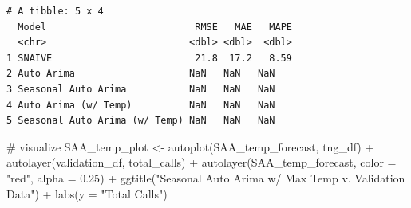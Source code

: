 \documentclass[
  letterpaper,
  DIV=11,
  numbers=noendperiod]{scrartcl}
\newenvironment{Shaded}{\begin{snugshade}}{\end{snugshade}}
\newcommand{\AttributeTok}[1]{\textcolor[rgb]{0.40,0.45,0.13}{#1}}
\newcommand{\CommentTok}[1]{\textcolor[rgb]{0.37,0.37,0.37}{#1}}
\newcommand{\FloatTok}[1]{\textcolor[rgb]{0.68,0.00,0.00}{#1}}
\newcommand{\FunctionTok}[1]{\textcolor[rgb]{0.28,0.35,0.67}{#1}}
\newcommand{\NormalTok}[1]{\textcolor[rgb]{0.00,0.23,0.31}{#1}}
\newcommand{\OtherTok}[1]{\textcolor[rgb]{0.00,0.23,0.31}{#1}}
\newcommand{\SpecialCharTok}[1]{\textcolor[rgb]{0.37,0.37,0.37}{#1}}
\newcommand{\StringTok}[1]{\textcolor[rgb]{0.13,0.47,0.30}{#1}}
\begin{document}
\begin{Shaded}
\end{Shaded}

\begin{verbatim}
# A tibble: 5 x 4
  Model                          RMSE   MAE   MAPE
  <chr>                         <dbl> <dbl>  <dbl>
1 SNAIVE                         21.8  17.2   8.59
2 Auto Arima                    NaN   NaN   NaN   
3 Seasonal Auto Arima           NaN   NaN   NaN   
4 Auto Arima (w/ Temp)          NaN   NaN   NaN   
5 Seasonal Auto Arima (w/ Temp) NaN   NaN   NaN   
\end{verbatim}

\begin{Shaded}
\begin{Highlighting}[]
\CommentTok{\# visualize}
\NormalTok{SAA\_temp\_plot }\OtherTok{\textless{}{-}} \FunctionTok{autoplot}\NormalTok{(SAA\_temp\_forecast, tng\_df) }\SpecialCharTok{+} 
  \FunctionTok{autolayer}\NormalTok{(validation\_df, total\_calls) }\SpecialCharTok{+} 
  \FunctionTok{autolayer}\NormalTok{(SAA\_temp\_forecast, }\AttributeTok{color =} \StringTok{"red"}\NormalTok{, }\AttributeTok{alpha =} \FloatTok{0.25}\NormalTok{) }\SpecialCharTok{+}
  \FunctionTok{ggtitle}\NormalTok{(}\StringTok{"Seasonal Auto Arima w/ Max Temp v. Validation Data"}\NormalTok{) }\SpecialCharTok{+} 
  \FunctionTok{labs}\NormalTok{(}\AttributeTok{y =} \StringTok{"Total Calls"}\NormalTok{)}
\end{Highlighting}
\end{Shaded}
\end{document}
